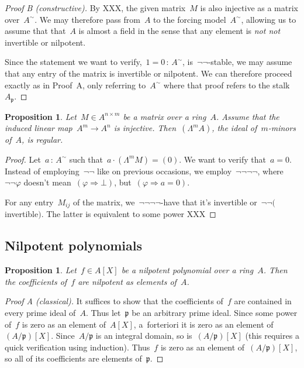 \documentclass{amsart}
\theoremstyle{definition}
\theoremstyle{plain}
\newtheorem{prop}[defn]{Proposition}
\theoremstyle{remark}
\newcommand{\ppp}{\mathfrak{p}}
\newcommand{\?}{\,{:}\,}
\newcommand{\notnot}{\emph{not not}\xspace}
\newcommand{\negg}{\neg\!\!\!\neg}
\begin{document}
\begin{proof}[Proof B (constructive)]By XXX, the given matrix~$M$ is also
injective as a matrix over~$A^\sim$. We may therefore pass from~$A$ to the
forcing model~$A^\sim$, allowing us to assume that that~$A$ is almost a field
in the sense that any element is \notnot invertible or nilpotent.

Since the statement we want to verify,~$1 = 0 \? A^\sim$, is~$\neg\neg$-stable,
we may assume that any entry of the matrix is invertible or nilpotent. We can
therefore proceed exactly as in Proof~A, only referring to~$A^\sim$ where that
proof refers to the stalk~$A_\ppp$.
\end{proof}

\begin{prop}Let~$M \in A^{n \times m}$ be a matrix over a ring~$A$. Assume that
the induced linear map~$A^m \to A^n$ is injective. Then~$(\Lambda^m A)$, the
ideal of~$m$-minors of~$A$, is regular.
\end{prop}

\begin{proof}Let~$a \? A^\sim$ such that~$a \cdot (\Lambda^m M) = (0)$. We want
to verify that~$a = 0$. Instead of employing~$\neg\neg$ like on previous
occasions, we employ~$\negg\negg$, where~$\negg\varphi$ doesn't mean~$(\varphi
\Rightarrow \bot)$, but~$(\varphi \Rightarrow a = 0)$.

For any entry~$M_{ij}$ of the matrix, we~$\negg\negg$-have that it's invertible
or~$\negg($invertible$)$. The latter is equivalent to some power XXX
\end{proof}


\subsection{Nilpotent polynomials}

\begin{prop}Let~$f \in A[X]$ be a nilpotent polynomial over a ring~$A$. Then
the coefficients of~$f$ are nilpotent as elements of~$A$.
\end{prop}

\begin{proof}[Proof A (classical)]It suffices to show that the coefficients
of~$f$ are contained in every prime ideal of~$A$. Thus let~$\ppp$ be an
arbitrary prime ideal. Since some power of~$f$ is zero as an element of~$A[X]$,
a~forteriori it is zero as an element of~$(A/\ppp)[X]$. Since~$A/\ppp$ is an
integral domain, so is~$(A/\ppp)[X]$ (this requires a quick verification using
induction). Thus~$f$ is zero as an element of~$(A/\ppp)[X]$, so all of its
coefficients are elements of~$\ppp$.
\end{proof}
\end{document}
